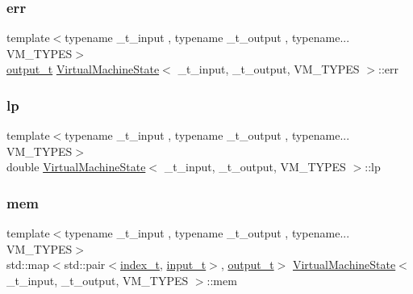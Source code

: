 \mbox{\label{class_virtual_machine_state_aa3eaa4b1432d1604b86039d2ff0faae1}} 
\subsubsection{\texorpdfstring{err}{err}}
{\footnotesize\ttfamily template$<$typename \+\_\+t\+\_\+input , typename \+\_\+t\+\_\+output , typename... V\+M\+\_\+\+T\+Y\+P\+ES$>$ \\
\hyperlink{class_virtual_machine_state_a1015cee5061f82f82ef6a953b51f9bd5}{output\+\_\+t} \hyperlink{class_virtual_machine_state}{Virtual\+Machine\+State}$<$ \+\_\+t\+\_\+input, \+\_\+t\+\_\+output, V\+M\+\_\+\+T\+Y\+P\+ES $>$\+::err}

\mbox{\label{class_virtual_machine_state_a5937b2c3afdfe35b9bba71dbdd83d5bd}} 
\subsubsection{\texorpdfstring{lp}{lp}}
{\footnotesize\ttfamily template$<$typename \+\_\+t\+\_\+input , typename \+\_\+t\+\_\+output , typename... V\+M\+\_\+\+T\+Y\+P\+ES$>$ \\
double \hyperlink{class_virtual_machine_state}{Virtual\+Machine\+State}$<$ \+\_\+t\+\_\+input, \+\_\+t\+\_\+output, V\+M\+\_\+\+T\+Y\+P\+ES $>$\+::lp}

\mbox{\label{class_virtual_machine_state_a8f36d4040b98a1e85fb7edf61e6085c9}} 
\subsubsection{\texorpdfstring{mem}{mem}}
{\footnotesize\ttfamily template$<$typename \+\_\+t\+\_\+input , typename \+\_\+t\+\_\+output , typename... V\+M\+\_\+\+T\+Y\+P\+ES$>$ \\
std\+::map$<$std\+::pair$<$\hyperlink{class_virtual_machine_state_a95ba2f54f65b778c8a012ea3e7a0ee50}{index\+\_\+t}, \hyperlink{class_virtual_machine_state_aeb5e01ec57466fd3734e0c29f2b8da0a}{input\+\_\+t}$>$, \hyperlink{class_virtual_machine_state_a1015cee5061f82f82ef6a953b51f9bd5}{output\+\_\+t}$>$ \hyperlink{class_virtual_machine_state}{Virtual\+Machine\+State}$<$ \+\_\+t\+\_\+input, \+\_\+t\+\_\+output, V\+M\+\_\+\+T\+Y\+P\+ES $>$\+::mem}

